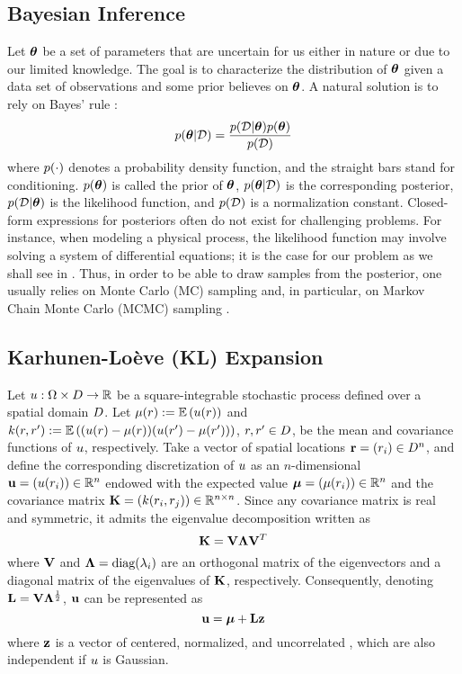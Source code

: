 \subsection{Bayesian Inference} 
Let ${\boldsymbol\theta}$ be a set of parameters that are uncertain for us either in nature or due to our limited knowledge. The goal is to characterize the distribution of ${\boldsymbol\theta}$ given a data set of observations and some prior believes on ${\boldsymbol\theta}$. A natural solution is to rely on Bayes' rule \cite{gelman2004}:
\begin{equation} \elabel{bayes}
  \f{\vparam | \Data} = \frac{\f{\Data | \vparam} \f{\vparam}}{\f{\Data}}
\end{equation}
where $\f{\cdot}$ denotes a probability density function, and the straight bars stand for conditioning. $\f{\vparam}$ is called the prior of ${\boldsymbol\theta}$, $\f{\vparam | \Data}$ is the corresponding posterior, $\f{\Data | \vparam}$ is the likelihood function, and $\f{\Data}$ is a normalization constant. Closed-form expressions for posteriors often do not exist for challenging problems. For instance, when modeling a physical process, the likelihood function may involve solving a system of differential equations; it is the case for our problem as we shall see in . Thus, in order to be able to draw samples from the posterior, one usually relies on Monte Carlo (MC) sampling and, in particular, on Markov Chain Monte Carlo (MCMC) sampling \cite{gelman2004}.

\subsection{Karhunen-Lo\`{e}ve (KL) Expansion} 
Let $u: \Omega \times D \to \mathbb{R}$ be a square-integrable stochastic process defined over a spatial domain $D$. Let $\fMean{\r} := \E{\u(\r)}$ and $\fCov{\r, \r'} := \E{(\u(\r) - \fMean{\r}) (\u(\r') - \fMean{\r'})}$, $r, r' \in D$, be the mean and covariance functions of $u$, respectively. Take a vector of spatial locations $\mathbf{r} = (r_i) \in D^n$, and define the corresponding discretization of $u$ as an $n$-dimensional \rv\ $\mathbf{u} = (u(r_i)) \in \mathbb{R}^n$ endowed with the expected value $\vmean = (\fMean{\r_i}) \in \real^n$ and the covariance matrix $\mCov = (\fCov{\r_i, \r_j}) \in \real^{n \times n}$. Since any covariance matrix is real and symmetric, it admits the eigenvalue decomposition \cite{press2007} written as
\[
  \mathbf{K} = \mathbf{V} \mathbf{\Lambda} \mathbf{V}^T
\]
where $\mathbf{V}$ and $\mathbf{\Lambda} = \text{diag}(\lambda_i)$ are an orthogonal matrix of the eigenvectors and a diagonal matrix of the eigenvalues of $\mathbf{K}$, respectively. Consequently, denoting $\mathbf{L} = \mathbf{V} \mathbf{\Lambda}^\frac{1}{2}$, $\mathbf{u}$ can be represented as
\begin{equation} \elabel{kl-expansion}
  \vu = \vmean + \mKL \vz
\end{equation}
where $\mathbf{z}$ is a vector of centered, normalized, and uncorrelated \rvs, which are also independent if $u$ is Gaussian.

